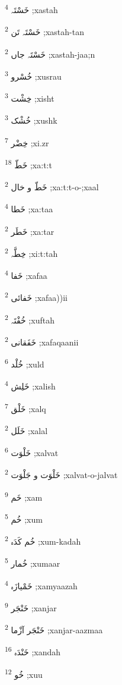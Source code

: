 \documentclass[12pt]{article}
\begin{document}
\begin{RTL}
\begin{multicols}{5}
{\ur خَسْتَہ}   \textsuperscript{4} ;xastah

{\ur خَسْتَہ تَن}   \textsuperscript{2} ;xastah-tan

{\ur خَسْتَہ جاں}   \textsuperscript{2} ;xastah-jaa;n

{\ur خُسْرو}   \textsuperscript{3} ;xusrau

{\ur خِشْت}   \textsuperscript{3} ;xisht

{\ur خُشْک}   \textsuperscript{3} ;xushk

{\ur خِضْر}   \textsuperscript{7} ;xi.zr

{\ur خَطّ}   \textsuperscript{18} ;xa:t:t

{\ur خَطّ و خال}   \textsuperscript{2} ;xa:t:t-o-;xaal

{\ur خَطا}   \textsuperscript{4} ;xa:taa

{\ur خَطَر}   \textsuperscript{2} ;xa:tar

{\ur خِطَّہ}   \textsuperscript{2} ;xi:t:tah

{\ur خَفا}   \textsuperscript{4} ;xafaa

{\ur خَفائی}   \textsuperscript{2} ;xafaa))ii

{\ur خُفْتَہ}   \textsuperscript{2} ;xuftah

{\ur خَفَقانی}   \textsuperscript{2} ;xafaqaanii

{\ur خُلْد}   \textsuperscript{6} ;xuld

{\ur خَلِش}   \textsuperscript{4} ;xalish

{\ur خَلْق}   \textsuperscript{7} ;xalq

{\ur خَلَل}   \textsuperscript{2} ;xalal

{\ur خَلْوَت}   \textsuperscript{6} ;xalvat

{\ur خَلْوَت و جَلْوَت}   \textsuperscript{2} ;xalvat-o-jalvat

{\ur خَم}   \textsuperscript{9} ;xam

{\ur خُم}   \textsuperscript{5} ;xum

{\ur خُم کَدَہ}   \textsuperscript{2} ;xum-kadah

{\ur خُمار}   \textsuperscript{5} ;xumaar

{\ur خَمْیازَہ}   \textsuperscript{4} ;xamyaazah

{\ur خَنْجَر}   \textsuperscript{9} ;xanjar

{\ur خَنْجَر آزْما}   \textsuperscript{2} ;xanjar-aazmaa

{\ur خَنْدَہ}   \textsuperscript{16} ;xandah

{\ur خُو}   \textsuperscript{12} ;xuu


\end{multicols}
\end{RTL}
\end{document}
